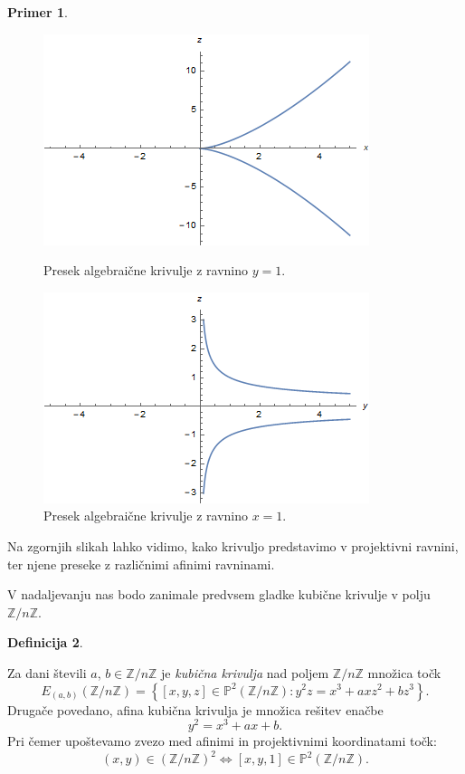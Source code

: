 \documentclass[12pt,a4paper,twoside]{article}
\theoremstyle{definition} %
\newtheorem{definicija}{Definicija}[section]
\newtheorem{primer}[definicija]{Primer}
\theoremstyle{plain} %
\numberwithin{equation}{section}  %
\newcommand{\Z}{\mathbb Z}
\newcommand{\PP}{\mathbb P}
\begin{document}
\begin{primer}
\begin{figure}[t]
\centering
\begin{minipage}{.45\textwidth}
\centering
\includegraphics[scale=0.5]{images/projektivnay.png}
\caption[Presek algebraične krivulje z ravnino $y=1$.]{Presek algebraične krivulje z ravnino $y=1$.}
\label{fig:projektivnay}
\end{minipage}%
\hfill
\begin{minipage}{.45\textwidth}
\centering
\includegraphics[scale=0.5]{images/projektivnax.png}
\caption[Presek algebraične krivulje z ravnino $x=1$.]{Presek algebraične krivulje z ravnino $x=1$.}
\label{fig:projektivnax}
\end{minipage}
\end{figure}


Na zgornjih slikah lahko vidimo, kako krivuljo predstavimo v projektivni ravnini, ter njene preseke z različnimi afinimi ravninami.

\end{primer}



V nadaljevanju nas bodo zanimale predvsem gladke kubične krivulje v polju $\mathbb{Z}/n\mathbb{Z}$.

\begin{definicija}~

Za dani števili $a$, $b \in \mathbb{Z}/n\mathbb{Z}$ je \emph{kubična krivulja} nad poljem $\mathbb{Z}/n\mathbb{Z}$ množica točk
$$E_{(a,b)}(\mathbb{Z}/n\mathbb{Z}) =\left\{ [x,y,z] \in \PP^2(\mathbb{Z}/n\mathbb{Z}): y^2z=x^3+axz^2+bz^3 \right\} .$$
Drugače povedano, afina kubična krivulja je množica rešitev enačbe
$$y^2=x^3+ax+b.$$
Pri čemer upoštevamo zvezo med afinimi in projektivnimi koordinatami točk:
$$(x,y)\in (\Z/n\Z)^2 \Leftrightarrow [x,y,1]\in \PP^2(\Z/n\Z).$$

\end{definicija}
\end{document}

